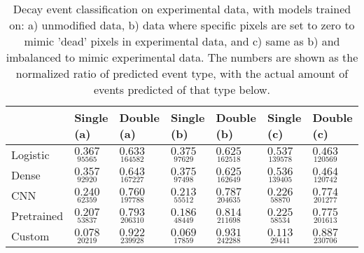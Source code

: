 \begin{table}
\centering
\caption{
Decay event classification on experimental data, with models trained on:
a) unmodified data, b) data where specific pixels are set to zero to mimic
'dead' pixels in experimental data, and c) same as b) and imbalanced to mimic experimental data.
The numbers are shown as the normalized ratio of predicted event type, with the actual amount of
events predicted of that type below.
}
\label{tab:classification-experimental-ratios}
\begin{tabular}{lllllll}
\toprule
{} &                                    Single (a) &                                     Double (a) &                                    Single (b) &                                     Double (b) &                                     Single (c) &                                     Double (c) \\
\midrule
Logistic   &  $\underset{\num{ 95565 }  }{\num{ 0.367 } }$ &  $\underset{\num{ 164582 }  }{\num{ 0.633 } }$ &  $\underset{\num{ 97629 }  }{\num{ 0.375 } }$ &  $\underset{\num{ 162518 }  }{\num{ 0.625 } }$ &  $\underset{\num{ 139578 }  }{\num{ 0.537 } }$ &  $\underset{\num{ 120569 }  }{\num{ 0.463 } }$ \\
Dense      &  $\underset{\num{ 92920 }  }{\num{ 0.357 } }$ &  $\underset{\num{ 167227 }  }{\num{ 0.643 } }$ &  $\underset{\num{ 97498 }  }{\num{ 0.375 } }$ &  $\underset{\num{ 162649 }  }{\num{ 0.625 } }$ &  $\underset{\num{ 139405 }  }{\num{ 0.536 } }$ &  $\underset{\num{ 120742 }  }{\num{ 0.464 } }$ \\
CNN        &  $\underset{\num{ 62359 }  }{\num{ 0.240 } }$ &  $\underset{\num{ 197788 }  }{\num{ 0.760 } }$ &  $\underset{\num{ 55512 }  }{\num{ 0.213 } }$ &  $\underset{\num{ 204635 }  }{\num{ 0.787 } }$ &  $\underset{\num{ 58870 }  }{\num{ 0.226 } }$ &  $\underset{\num{ 201277 }  }{\num{ 0.774 } }$ \\
Pretrained &  $\underset{\num{ 53837 }  }{\num{ 0.207 } }$ &  $\underset{\num{ 206310 }  }{\num{ 0.793 } }$ &  $\underset{\num{ 48449 }  }{\num{ 0.186 } }$ &  $\underset{\num{ 211698 }  }{\num{ 0.814 } }$ &  $\underset{\num{ 58534 }  }{\num{ 0.225 } }$ &  $\underset{\num{ 201613 }  }{\num{ 0.775 } }$ \\
Custom     &  $\underset{\num{ 20219 }  }{\num{ 0.078 } }$ &  $\underset{\num{ 239928 }  }{\num{ 0.922 } }$ &  $\underset{\num{ 17859 }  }{\num{ 0.069 } }$ &  $\underset{\num{ 242288 }  }{\num{ 0.931 } }$ &  $\underset{\num{ 29441 }  }{\num{ 0.113 } }$ &  $\underset{\num{ 230706 }  }{\num{ 0.887 } }$ \\
\bottomrule
\end{tabular}
\end{table}
